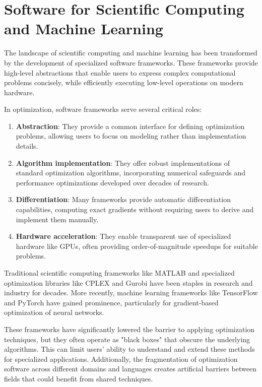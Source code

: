 \section{Software for Scientific Computing and Machine Learning}

The landscape of scientific computing and machine learning has been transformed by the development of specialized software frameworks. These frameworks provide high-level abstractions that enable users to express complex computational problems concisely, while efficiently executing low-level operations on modern hardware.

In optimization, software frameworks serve several critical roles:

\begin{enumerate}
\item \textbf{Abstraction}: They provide a common interface for defining optimization problems, allowing users to focus on modeling rather than implementation details.

\item \textbf{Algorithm implementation}: They offer robust implementations of standard optimization algorithms, incorporating numerical safeguards and performance optimizations developed over decades of research.

\item \textbf{Differentiation}: Many frameworks provide automatic differentiation capabilities, computing exact gradients without requiring users to derive and implement them manually.

\item \textbf{Hardware acceleration}: They enable transparent use of specialized hardware like GPUs, often providing order-of-magnitude speedups for suitable problems.
\end{enumerate}

Traditional scientific computing frameworks like MATLAB and specialized optimization libraries like CPLEX and Gurobi have been staples in research and industry for decades. More recently, machine learning frameworks like TensorFlow and PyTorch have gained prominence, particularly for gradient-based optimization of neural networks.

These frameworks have significantly lowered the barrier to applying optimization techniques, but they often operate as "black boxes" that obscure the underlying algorithms. This can limit users' ability to understand and extend these methods for specialized applications. Additionally, the fragmentation of optimization software across different domains and languages creates artificial barriers between fields that could benefit from shared techniques.

